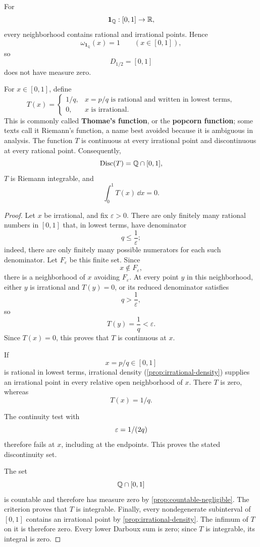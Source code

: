 \begin{example}
\label{ex:dirichlet-function}
For
\[
\mathbf{1}_{\mathbb{Q}}:[0,1]\to\mathbb{R},
\]
every neighborhood contains rational and irrational points.  Hence
\[
\omega_{\mathbf{1}_{\mathbb{Q}}}(x)=1
\qquad(x\in[0,1]),
\]
so
\[
D_{1/2}=[0,1]
\]
does not have measure zero.
\end{example}

\begin{example}
\label{ex:thomae-function}
For $x\in[0,1]$, define
\[
T(x)=
\begin{cases}
1/q,&x=p/q\text{ is rational and written in lowest terms},\\
0,&x\text{ is irrational}.
\end{cases}
\]
This is commonly called \textbf{Thomae's function}, or the
\textbf{popcorn function}; some texts call it Riemann's function, a name
best avoided because it is ambiguous in analysis.  The function $T$ is
continuous at every irrational point and discontinuous at every rational
point.  Consequently,
\[
\operatorname{Disc}(T)=\mathbb{Q}\cap[0,1],
\]
$T$ is Riemann integrable, and
\[
\int_0^1T(x)\,\dd x=0.
\]
\end{example}
\begin{proof}
Let $x$ be irrational, and fix $\varepsilon>0$.  There are only finitely
many rational numbers in $[0,1]$ that, in lowest terms, have denominator
\[
q\leq\frac1\varepsilon;
\]
indeed, there are only finitely many possible numerators for each such
denominator.  Let $F_\varepsilon$ be this finite set.  Since
\[
x\notin F_\varepsilon,
\]
there is a neighborhood of $x$ avoiding $F_\varepsilon$.  At every point
$y$ in this neighborhood, either $y$ is irrational and $T(y)=0$, or its
reduced denominator satisfies
\[
q>\frac1\varepsilon,
\]
so
\[
T(y)=\frac1q<\varepsilon.
\]
Since $T(x)=0$, this proves that $T$ is continuous at $x$.

If
\[
x=p/q\in[0,1]
\]
 is rational in lowest terms, irrational density
(\cref{prop:irrational-density}) supplies an irrational point in every
relative open neighborhood of $x$. There $T$ is zero, whereas
\[
T(x)=1/q.
\]

The continuity test with
\[
\varepsilon=1/(2q)
\]
 therefore fails at $x$, including
at the endpoints. This proves the stated discontinuity set.

The set
\[
\mathbb{Q}\cap[0,1]
\]
is countable and therefore has measure zero by
\cref{prop:countable-negligible}.  The criterion proves that $T$ is
integrable.  Finally, every nondegenerate subinterval of $[0,1]$ contains an
irrational point by \cref{prop:irrational-density}.
The infimum of $T$ on it is therefore zero.  Every lower Darboux sum is zero;
since $T$ is integrable, its integral is zero.
\end{proof}


